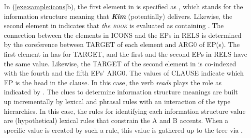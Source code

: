 \newpage 
{}


\noindent In (\ref{exe:sample:icons}b), the first element in  is
specified as , which stands for the information
structure meaning that \textit{\textbf{Kim}} (potentially)
delivers. Likewise, the second element in  indicates that
\textit{the \textsc{book}} is evaluated as containing
.  The connection between the elements in ICONS
and the EPs in RELS is determined by the coreference between TARGET of
each  element and ARG0 of EP(s). The first element in  has
 for TARGET, and the first and the second EPs in RELS
have the same value. Likewise, the TARGET of the second element in
 is co-indexed with the fourth and the fifth EPs' ARG0. The
values of CLAUSE indicate which EP is the head in the clause. In this
case, the verb \textit{reads} plays the role as indicated by
.  The clues to determine information structure
meanings are built up incrementally by lexical and phrasal rules with
an interaction of the type hierarchies. In this case, the rules for
identifying each information structure value are (hypothetical)
lexical rules that constrain the A and B accents.  When a specific
 value is created by such a rule, this value is gathered
up to the tree via  .



